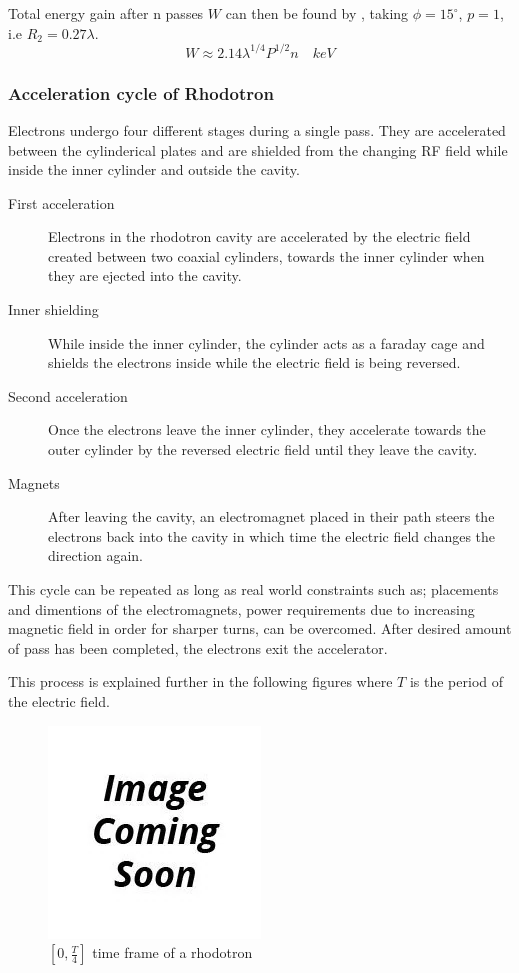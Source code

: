 \documentclass{article}
\begin{document}
Total energy gain after n passes $W$ can then be found by , taking $\phi = 15^\circ$, $p=1$, i.e $R_2 = 0.27 \lambda$.
\begin{equation}
    \label{eq:W_total_gain_pottier}
    W \approx 2.14 \lambda^{1/4} P^{1/2} n \quad keV
\end{equation}

\subsubsection{Acceleration cycle of Rhodotron}

Electrons undergo four different stages during a single pass. 
They are accelerated between the cylinderical plates and are shielded from the changing RF field while inside the inner cylinder and outside the cavity. 

\begin{description}
    \item[First acceleration] Electrons in the rhodotron cavity are accelerated by the electric field created between two coaxial cylinders, towards the inner cylinder when they are ejected into the cavity.
    \item[Inner shielding] While inside the inner cylinder, the cylinder acts as a faraday cage and shields the electrons inside while the electric field is being reversed.
    \item[Second acceleration] Once the electrons leave the inner cylinder, they accelerate towards the outer cylinder by the reversed electric field until they leave the cavity.
    \item[Magnets] After leaving the cavity, an electromagnet placed in their path steers the electrons back into the cavity in which time the electric field changes the direction again.
\end{description}

This cycle can be repeated as long as real world constraints such as; placements and dimentions of the electromagnets, power requirements due to increasing magnetic field in order for sharper turns, can be overcomed.
After desired amount of pass has been completed, the electrons exit the accelerator.

This process is explained further in the following figures where $T$ is the period of the electric field.
\begin{figure}[H]
    \centering
    \includegraphics[scale=0.75]{../../../figures/to_be_added.png}
    \caption{$[0, \frac{T}{4}]$ time frame of a rhodotron}
\end{figure}
\end{document}

